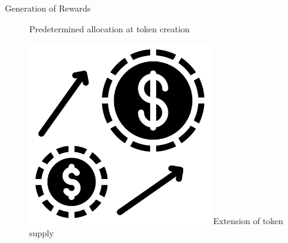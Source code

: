\documentclass[handout]{beamer}
\begin{document}
\begin{frame}{Generation of Rewards}
\begin{figure}[H]
\begin{minipage}[t]{.25\textwidth}
    Predetermined allocation at token creation
  \end{minipage}
  \hfill
  \begin{minipage}[t]{.25\textwidth}
  \center 
    \includegraphics[width=0.7\textwidth]{../assets/images/inflation.png}
    \vspace{0.8em}\vspace{0.8em}
    Extension of token supply
  \end{minipage}  
\end{figure}




	
\end{frame}
\end{document}
